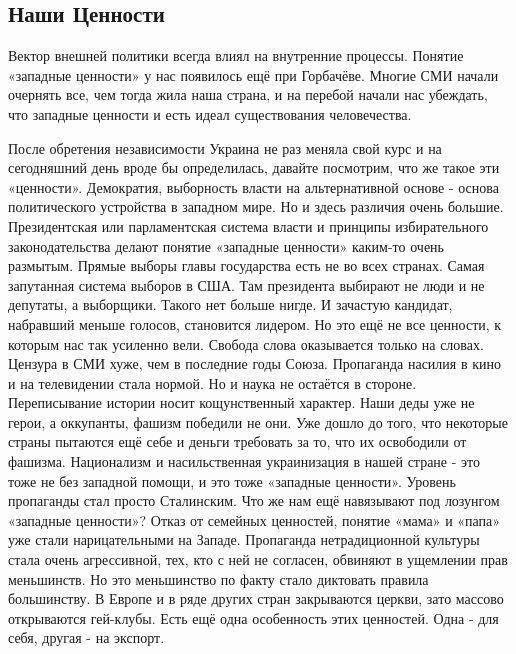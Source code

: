  
 

\subsection{Наши Ценности}

Вектор внешней политики всегда влиял на внутренние процессы. Понятие «западные
ценности» у нас появилось ещё при Горбачёве. Многие СМИ начали очернять все,
чем тогда жила наша страна, и на перебой начали нас убеждать, что западные
ценности и есть идеал существования человечества.

После обретения независимости Украина  не раз меняла свой курс и на сегодняшний
день вроде бы определилась, давайте посмотрим, что же такое эти «ценности».
Демократия, выборность власти на альтернативной основе - основа политического
устройства в западном мире.  Но и здесь различия очень большие.  Президентская
или парламентская система власти и принципы избирательного законодательства
делают понятие «западные ценности» каким-то очень размытым.  Прямые выборы
главы государства есть не во всех странах.  Самая запутанная система выборов в
США.  Там президента выбирают не люди и не депутаты, а выборщики.  Такого нет
больше нигде.  И зачастую кандидат, набравший меньше голосов, становится
лидером.  Но это ещё не все ценности, к которым нас так усиленно вели.  Свобода
слова оказывается только на словах.  Цензура в СМИ хуже, чем в последние годы
Союза.  Пропаганда насилия в кино и на телевидении стала нормой.  Но и наука не
остаётся в стороне.  Переписывание истории носит кощунственный характер.  Наши
деды уже не герои, а оккупанты, фашизм победили не они.  Уже дошло до того, что
некоторые страны пытаются ещё себе и деньги требовать за то, что их освободили
от фашизма.  Национализм и насильственная украинизация в нашей стране - это
тоже не без западной помощи, и это тоже «западные ценности».  Уровень
пропаганды стал просто Сталинским.  Что же нам ещё навязывают под лозунгом
«западные ценности»?  Отказ от семейных ценностей, понятие «мама» и «папа» уже
стали нарицательными на Западе.  Пропаганда нетрадиционной культуры стала очень
агрессивной, тех, кто с ней не согласен, обвиняют в ущемлении прав меньшинств.
Но это меньшинство по факту стало диктовать правила большинству.  В Европе и в
ряде других стран закрываются церкви, зато массово открываются гей-клубы.  Есть
ещё одна особенность этих ценностей.  Одна - для себя, другая - на экспорт.
